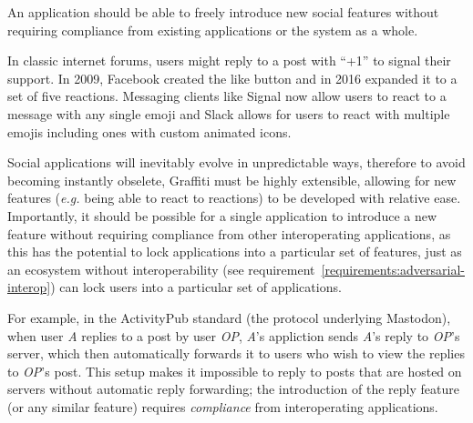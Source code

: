 


\begin{requirement}
\label{requirements:autonomous-extensibility}
    An application should be able to freely introduce new social features without requiring compliance from existing applications or the system as a whole.
\end{requirement}

In classic internet forums, users might reply to a post with ``+1'' to signal their support.
In 2009, Facebook created the like button and in 2016 expanded it to a set of five reactions.
Messaging clients like Signal now allow users to react to a message with any single emoji and
Slack allows for users to react with multiple emojis including ones with custom animated icons.

Social applications will inevitably evolve in unpredictable ways,
therefore to avoid becoming instantly obselete, Graffiti must be highly extensible,
allowing for new features (\emph{e.g.} being able to react to reactions)
to be developed with relative ease.
Importantly, it should be possible for a single application to introduce a new feature
without requiring compliance from other interoperating applications, as this has the potential to
lock applications into a particular set of features,
just as an ecosystem without interoperability (see requirement~\ref{requirements:adversarial-interop}) can lock users into a
particular set of applications.

For example, in the ActivityPub standard (the protocol underlying Mastodon),
when user \emph{A} replies to a post by user \emph{OP}, \emph{A}'s appliction
sends \emph{A}'s reply to \emph{OP}'s server, which then automatically forwards
it to users who wish to view the replies to \emph{OP}'s post.
This setup makes it impossible to reply to posts that are hosted on servers
without automatic reply forwarding;
the introduction of the reply feature (or any similar feature) requires \emph{compliance}
from interoperating applications.

